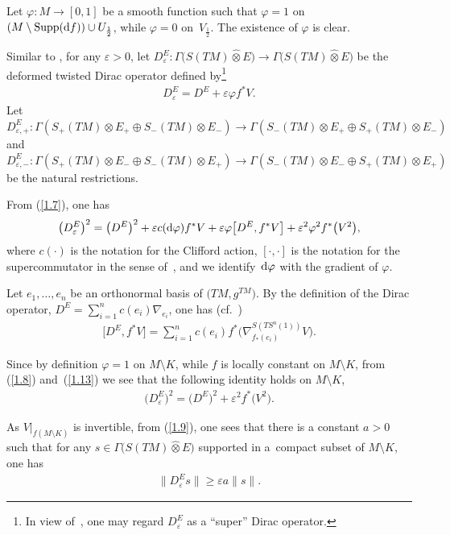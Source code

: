 \documentclass[pdftex]{sigma}
\numberwithin{equation}{section}
\theoremstyle{definition}
\begin{document}
Let $\varphi\colon M\rightarrow [0,1]$ be a smooth function such that $\varphi=1$ on $(M\setminus \operatorname{Supp}({\rm d}f) )\cup U_{\frac{1}{2}}$, while $\varphi=0$ on~$V_{\frac{1}{2}}$. The existence of $\varphi$ is clear.

Similar to \cite[equation~(1.11)]{Z19}, for any $\varepsilon>0$, let $D^E_\varepsilon\colon \Gamma\big(S(TM)\widehat\otimes E\big)\rightarrow
\Gamma\big(S(TM)\widehat\otimes E\big)$ be the deformed twisted Dirac operator defined by\footnote{In view of~\cite{Q85}, one may regard $D^E_\varepsilon$ as a ``super'' Dirac operator.}
\begin{gather}\label{1.7}
D^E_\varepsilon =D^E+\varepsilon \varphi f^*V.
\end{gather}
Let $D^E_{\varepsilon,+}\colon \Gamma(S_+(TM) \otimes E_+\oplus S_-(TM)\otimes E_-) \rightarrow \Gamma(S_-(TM) \otimes E_+\oplus S_+(TM)\otimes E_-) $ and $D^E_{\varepsilon,-}\colon \Gamma(S_+(TM) \otimes E_-\oplus S_-(TM)\otimes E_+) \rightarrow \Gamma(S_-(TM) \otimes E_-\oplus S_+(TM)\otimes E_+) $ be the natural restrictions.

From (\ref{1.7}), one has
\begin{gather}\label{1.8}
\big(D^E_\varepsilon\big)^2 =\big(D^E\big)^2+\varepsilon c({\rm d}\varphi) f^*V
+\varepsilon \varphi\big[D^E,f^*V\big]+\varepsilon^2\varphi^2f^*\big(V^2\big),
\end{gather}
where $c(\cdot)$ is the notation for the Clifford action, $[\cdot,\cdot]$ is the notation for the supercommutator in the sense of~\cite{Q85}, and we identify~${\rm d}\varphi$ with the gradient of $\varphi$.

Let $e_1, \dots, e_n$ be an orthonormal basis of $\big(TM,g^{TM}\big)$. By the definition of the Dirac operator, $D^E=\sum\limits_{i=1}^n c(e_i)\nabla_{e_i}$, one has (cf.~\cite{Z19})
\begin{gather}\label{1.13}
\big[D^E,f^*V\big] =\sum_{i=1}^nc (e_i ) f^* \big(\nabla^{S(TS^n(1))}_{f_*(e_i)}V\big).
\end{gather}

Since by definition $\varphi=1$ on $M\setminus K$, while $f$ is locally constant on $M\setminus K $, from (\ref{1.8}) and~(\ref{1.13}) we see that the following identity holds on $M\setminus K$,
\begin{gather}\label{1.9}
\big(D^E_\varepsilon\big)^2 =\big(D^E\big)^2 +\varepsilon^2 f^*\big(V ^2\big).
\end{gather}

As $V|_{ {f(M\setminus K)}}$ is invertible, from (\ref{1.9}), one sees that there is a constant $a>0$ such that for any $s\in \Gamma\big(S(TM)\widehat\otimes E\big)$ supported in a~compact subset of $M\setminus K$, one has
\begin{gather}\label{1.10}
\big\|D^E_\varepsilon s\big\| \geq \varepsilon a \|s\|.
\end{gather}
\end{document}
